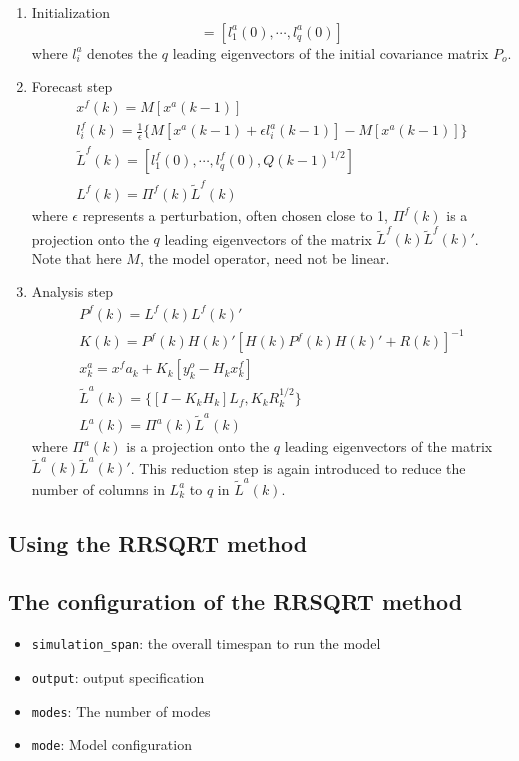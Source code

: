 \begin{enumerate}
\item Initialization
  \begin{equation}
    [L^a(0)]=[l_1^a(0),\cdots,l_q^a(0)]
  \end{equation}
  where $l_i^a$ denotes the $q$ leading eigenvectors of the initial covariance
  matrix $P_o$.

\item Forecast step
  \begin{eqnarray}
    x^f(k)=M[x^a(k-1)] \\
    l^f_i(k)=\frac{1}{\epsilon} \{ M[x^a(k-1)+ \epsilon  l^a_i(k-1)]-M[x^a(k-1)] \} \\
    \tilde{L}^f(k)=[l_1^f(0),\cdots,l_q^f(0),Q(k-1)^{1/2}] \\
    L^f(k)=\Pi^f(k)\tilde{L}^f(k)
  \end{eqnarray}
where $\epsilon$ represents a perturbation, often chosen close to 1, $\Pi^f(k)$
is a projection onto the $q$ leading eigenvectors of the matrix
$\tilde{L}^f(k)\tilde{L}^f(k)'$. Note that here $M$, the model operator, need
not be linear.

\item Analysis step
  \begin{eqnarray}
    P^f(k)=L^f(k)L^f(k)' \\
    K(k) = P^f(k)H(k)'[H(k)P^f(k)H(k)'+R(k)]^{-1} \\
    x^a_k = x^fa_k + K_k [y^o_k - H_k x^f_k] \\
    \tilde{L}^a(k)=\{[I - K_k H_k] L_f, K_k R_k^{1/2}\} \\
    L^a(k)=\Pi^a(k)\tilde{L}^a(k)
  \end{eqnarray}
where $\Pi^a(k)$ is a projection onto the $q$ leading eigenvectors of the
matrix $\tilde{L}^a(k)\tilde{L}^a(k)'$. This reduction step is again introduced
to reduce the number of columns in $L^a_k$ to $q$ in $\tilde{L}^a(k)$.
\end{enumerate}

\subsection{Using the RRSQRT method}



\subsection{The configuration of the RRSQRT method}
\begin{itemize}
\item {\tt simulation\_span}: the overall timespan to run the model
\item {\tt output}: output specification
\item {\tt modes}: The number of modes
\item {\tt mode}: Model configuration
\end{itemize}

